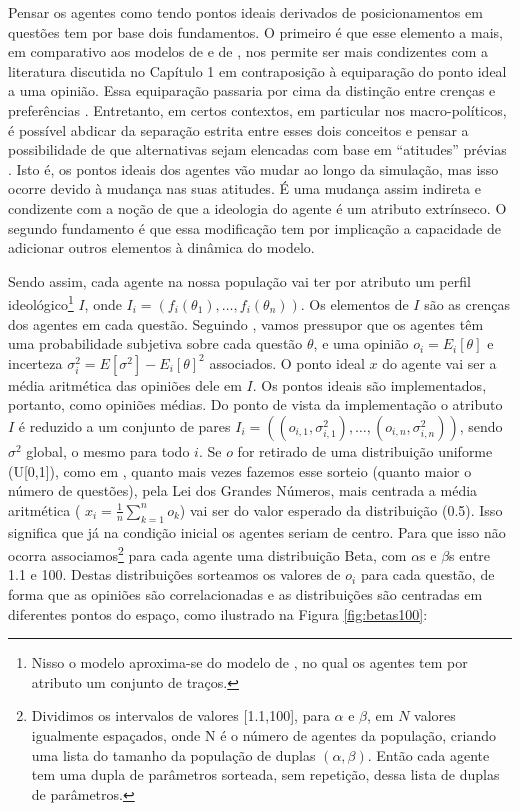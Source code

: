 Pensar os agentes como tendo pontos ideais derivados de posicionamentos em
questões tem por base dois fundamentos. O primeiro é que esse elemento a mais,
em comparativo aos modelos de  e de
, nos permite ser mais condizentes com a
literatura discutida no Capítulo 1 em contraposição à equiparação do ponto ideal
a uma opinião. Essa equiparação passaria por cima da distinção entre crenças e
preferências \cite{list2009judgment}. Entretanto, em certos contextos, em
particular nos macro-políticos, é possível abdicar da separação estrita entre
esses dois conceitos e pensar a possibilidade de que alternativas sejam
elencadas com base em ``atitudes'' prévias
\cite{binmore2008rational,laver2014measuring}. Isto é, os pontos ideais dos
agentes vão mudar ao longo da simulação, mas isso ocorre devido à mudança nas
suas atitudes. É uma mudança assim indireta e condizente com a noção de que a
ideologia do agente é um atributo extrínseco. O segundo fundamento é que essa
modificação tem por implicação a capacidade de adicionar outros elementos à
dinâmica do modelo.

Sendo assim, cada agente na nossa população vai ter por atributo um perfil
ideológico\footnote{Nisso o modelo aproxima-se do modelo de
  , no qual os agentes tem por atributo um
  conjunto de traços.} \(I\), onde \(I_i = (f_i(\theta_1), \ldots, f_i(\theta_n)) \). Os
elementos de \(I\) são as crenças dos agentes em cada questão. Seguindo
, vamos pressupor que os agentes têm uma
probabilidade subjetiva sobre cada questão \(\theta\), e uma opinião \( o_i =
E_i[\theta]\) e incerteza \( \sigma_i^2 = E[\sigma^2] - E_ i[\theta]^2\) associados. O ponto ideal
\(x\) do agente vai ser a média aritmética das opiniões dele em \(I\). Os pontos
ideais são implementados, portanto, como opiniões médias. Do ponto de vista da
implementação o atributo \(I\) é reduzido a um conjunto de pares \(I_i =
((o_{i,1},\sigma_{i,1}^2), \ldots, (o_{i,n}, \sigma_{i,n}^2) )\), sendo \(\sigma^2\) global, o mesmo
para todo \(i\). Se \(o\) for retirado de uma distribuição uniforme (U[0,1]),
como em , quanto mais vezes fazemos esse sorteio
(quanto maior o número de questões), pela Lei dos Grandes Números, mais centrada
a média aritmética ( \(x_i = \frac{1}{n}\sum_{k=1}^{n} o_k\)) vai ser do valor
esperado da distribuição (0.5). Isso significa que já na condição inicial os
agentes seriam de centro. Para que isso não ocorra associamos\footnote{Dividimos
  os intervalos de valores [1.1,100], para \(\alpha\) e \(\beta\), em \(N\) valores
  igualmente espaçados, onde N é o número de agentes da população, criando uma
  lista do tamanho da população de duplas \((\alpha,\beta)\). Então cada agente tem uma
  dupla de parâmetros sorteada, sem repetição, dessa lista de duplas de
  parâmetros.} para cada agente uma distribuição Beta, com \(\alpha\)s e \(\beta\)s entre
1.1 e 100. Destas distribuições sorteamos os valores de \(o_i\) para cada
questão, de forma que as opiniões são correlacionadas e as distribuições são
centradas em diferentes pontos do espaço, como ilustrado na Figura
\ref{fig:betas100}:

